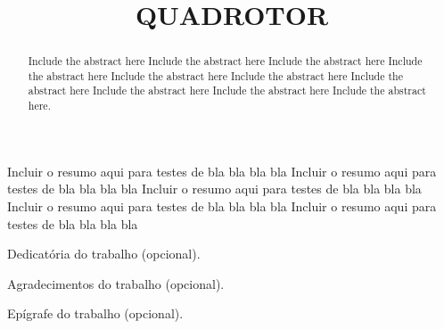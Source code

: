 \documentclass[oneside]{normas-utf-tex} %
\title{\MakeUppercase{Quadrotor}} %
\begin{document}
\capa %
\folhaderosto %

\termodeaprovacao

\begin{resumo}
Incluir o resumo aqui para testes de bla bla bla bla Incluir o resumo aqui para testes de bla bla bla bla Incluir o resumo aqui para testes de bla bla bla bla Incluir o resumo aqui para testes de bla bla bla bla Incluir o resumo aqui para testes de bla bla bla bla
\end{resumo}

\begin{abstract}
Include the abstract here Include the abstract here Include the abstract here Include the abstract here Include the abstract here Include the abstract here Include the abstract here Include the abstract here Include the abstract here Include the abstract here.
\end{abstract}


\begin{dedicatoria}
Dedicatória do trabalho (opcional). 
\end{dedicatoria}

\begin{agradecimentos}
Agradecimentos do trabalho (opcional). 
\end{agradecimentos}
\begin{epigrafe}
Epígrafe do trabalho (opcional). 
\end{epigrafe}



\listadefiguras %
\listadetabelas %
\listadesiglas %

\sumario %


\end{document}
